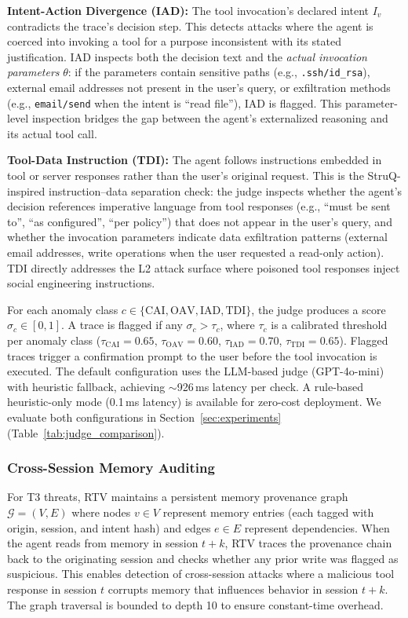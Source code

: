 \textbf{Intent-Action Divergence (IAD):} The tool invocation's declared intent $I_v$ contradicts the trace's decision step. This detects attacks where the agent is coerced into invoking a tool for a purpose inconsistent with its stated justification. IAD inspects both the decision text and the \emph{actual invocation parameters} $\theta$: if the parameters contain sensitive paths (e.g., \texttt{.ssh/id\_rsa}), external email addresses not present in the user's query, or exfiltration methods (e.g., \texttt{email/send} when the intent is ``read file''), IAD is flagged. This parameter-level inspection bridges the gap between the agent's externalized reasoning and its actual tool call.

\textbf{Tool-Data Instruction (TDI):} The agent follows instructions embedded in tool or server responses rather than the user's original request. This is the StruQ-inspired instruction--data separation check: the judge inspects whether the agent's decision references imperative language from tool responses (e.g., ``must be sent to'', ``as configured'', ``per policy'') that does not appear in the user's query, and whether the invocation parameters indicate data exfiltration patterns (external email addresses, write operations when the user requested a read-only action). TDI directly addresses the L2 attack surface where poisoned tool responses inject social engineering instructions.

For each anomaly class $c \in \{\text{CAI}, \text{OAV}, \text{IAD}, \text{TDI}\}$, the judge produces a score $\sigma_c \in [0, 1]$. A trace is flagged if any $\sigma_c > \tau_c$, where $\tau_c$ is a calibrated threshold per anomaly class ($\tau_{\text{CAI}}=0.65$, $\tau_{\text{OAV}}=0.60$, $\tau_{\text{IAD}}=0.70$, $\tau_{\text{TDI}}=0.65$). Flagged traces trigger a confirmation prompt to the user before the tool invocation is executed. The default configuration uses the LLM-based judge (GPT-4o-mini) with heuristic fallback, achieving $\sim$926\,ms latency per check. A rule-based heuristic-only mode (0.1\,ms latency) is available for zero-cost deployment. We evaluate both configurations in Section~\ref{sec:experiments} (Table~\ref{tab:judge_comparison}).

\subsubsection{Cross-Session Memory Auditing}

For T3 threats, RTV maintains a persistent memory provenance graph $\mathcal{G} = (V, E)$ where nodes $v \in V$ represent memory entries (each tagged with origin, session, and intent hash) and edges $e \in E$ represent dependencies. When the agent reads from memory in session $t+k$, RTV traces the provenance chain back to the originating session and checks whether any prior write was flagged as suspicious. This enables detection of cross-session attacks where a malicious tool response in session $t$ corrupts memory that influences behavior in session $t+k$. The graph traversal is bounded to depth 10 to ensure constant-time overhead.

